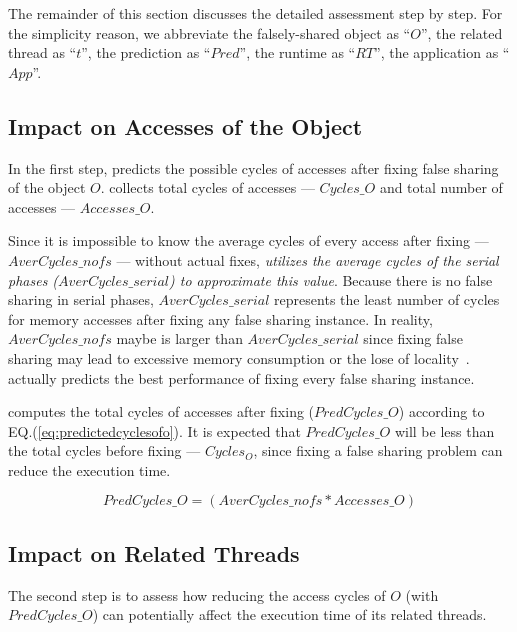 The remainder of this section discusses the detailed assessment step by step. For the simplicity reason, we abbreviate the falsely-shared object as ``$O$'', the related thread as ``$t$'', the prediction as ``$Pred$'', the runtime as ``$RT$'', the application as ``$App$''. 

\subsection{Impact on Accesses of the Object}
\label{sec:impactobject}

In the first step, \cheetah{} predicts the possible cycles of accesses after fixing false sharing of the object $O$.  \cheetah{} collects total cycles of accesses --- $Cycles\_O$ and total number of accesses --- $Accesses\_O$. 

Since it is impossible to know the average cycles of every access after fixing --- $AverCycles\_{nofs}$ --- without actual fixes, {\it \cheetah{} utilizes the average cycles of the serial phases ($AverCycles\_{serial}$) to approximate this value}. Because there is no false sharing in serial phases, $AverCycles\_{serial}$ represents the least number of cycles for memory accesses after fixing any false sharing instance. In reality, $AverCycles\_{nofs}$ maybe is larger than $AverCycles\_{serial}$ since fixing false sharing may lead to excessive memory consumption or the lose of locality~\cite{qinzhao}. \cheetah{} actually predicts the best performance of fixing every false sharing instance. 
 
 \cheetah{} computes the total cycles of accesses after fixing ($PredCycles\_{O}$) according to EQ.(\ref{eq:predictedcyclesofo}).  It is expected that $PredCycles\_{O}$ will be less than the total cycles before fixing --- $Cycles_O$, since fixing a false sharing problem can reduce the execution time.  

\begin{equation}
\label{eq:predictedcyclesofo}
 PredCycles\_{O} = (AverCycles\_{nofs} * Accesses\_O)
\end{equation} 

\subsection{Impact on Related Threads}
\label{sec:impactthread}

The second step is to assess how reducing the access cycles of $O$ (with $PredCycles\_{O}$) can potentially affect the execution time of its related threads. 

